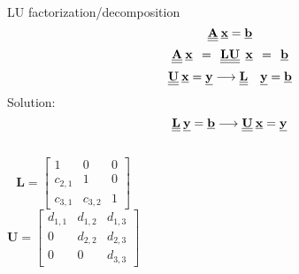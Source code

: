 \documentclass[xcolor={dvipsnames,rgb}, aspectratio=169]{beamer}
\begin{document}
\begin{frame}{LU factorization/decomposition}
    \begin{equation*}
        \textbf{\underline{\underline{A}}} \: \textbf{\underline{x}} =
        \textbf{\underline{b}}
    \end{equation*}
    \begin{equation*}
        \textbf{\underline{\underline{A}}} \: \textbf{\underline{x}} \: \: = \: \:
        \textbf{\underline{\underline{L}}} \textbf{\underline{\underline{U}}} \: \:
        \textbf{\underline{x}} \: \: = \: \: \textbf{\underline{b}}
    \end{equation*}
    \begin{equation*}
        \textbf{\underline{\underline{U}}} \: \textbf{\underline{x}} =
        \textbf{\underline{y}}  \longrightarrow \textbf{\underline{\underline{L}}} \quad
        \textbf{\underline{y}} =  \textbf{\underline{b}}
    \end{equation*}
    \quad \quad \quad \quad \quad \quad \quad \quad \quad \quad Solution:
    \begin{equation*}
        \textbf{\underline{\underline{L}}} \: \textbf{\underline{y}} =
        \textbf{\underline{b}} \longrightarrow \textbf{\underline{\underline{U}}} \:
        \textbf{\underline{x}} = \textbf{\underline{y}}
    \end{equation*}
    \begin{columns}
    \begin{equation*}
        \textbf{L} = \begin{bmatrix}
        1 & 0 & 0 \\
        c_{2,1} & 1 & 0 \\
        c_{3,1} & c_{3,2} & 1
        \end{bmatrix}
    \end{equation*}
    \begin{equation*}
        \textbf{U} = \begin{bmatrix}
        d_{1,1} & d_{1,2} & d_{1,3} \\
        0 & d_{2,2} & d_{2,3} \\
        0 & 0 & d_{3,3}
        \end{bmatrix}
    \end{equation*}
    \end{columns}
\end{frame}
\end{document}
